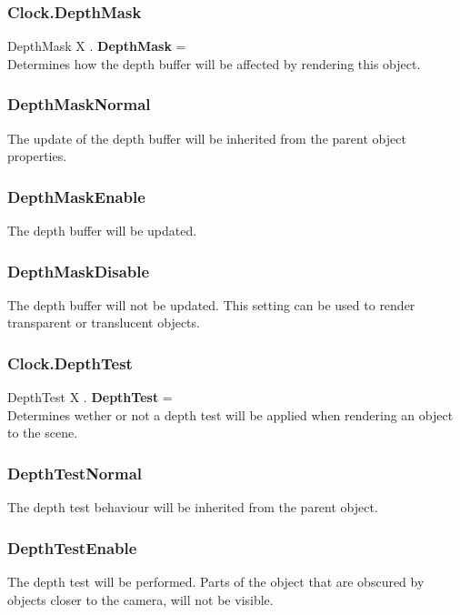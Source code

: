 \documentclass[10pt]{book}
\begin{document}
\subsubsection{Clock.DepthMask \label{F:Clock:DepthMask}}
DepthMask X . \textbf{DepthMask} = \\
Determines how the depth buffer will be affected by rendering this object.

\subsubsection{DepthMaskNormal \label{T:DepthMask|DepthMaskNormal}}
The update of the depth buffer will be inherited from the parent object properties.

\subsubsection{DepthMaskEnable \label{T:DepthMask|DepthMaskEnable}}
The depth buffer will be updated.

\subsubsection{DepthMaskDisable \label{T:DepthMask|DepthMaskDisable}}
The depth buffer will not be updated. This setting can be used to render transparent or translucent objects.

\subsubsection{Clock.DepthTest \label{F:Clock:DepthTest}}
DepthTest X . \textbf{DepthTest} = \\
Determines wether or not a depth test will be applied when rendering an object to the scene.

\subsubsection{DepthTestNormal \label{T:DepthTest|DepthTestNormal}}
The depth test behaviour will be inherited from the parent object.

\subsubsection{DepthTestEnable \label{T:DepthTest|DepthTestEnable}}
The depth test will be performed. Parts of the object that are obscured by objects closer to the camera, will not be visible.
\end{document}
